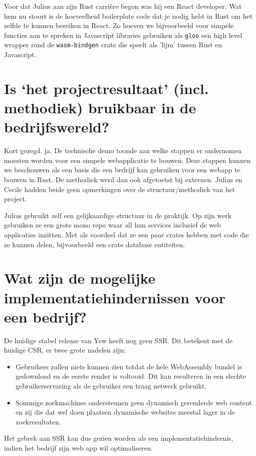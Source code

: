 Voor dat Julius aan zijn Rust carrière begon was hij een React developer. Wat hem nu stoort is de
hoeveelheid boilerplate code dat je nodig hebt in Rust om het zelfde te kunnen bereiken in React.
Zo hoeven we bijvoorbeeld voor simpele functies aan te spreken in Javascript libraries gebruiken als
\texttt{gloo} een high level wrapper rond de \texttt{wasm-bindgen} crate die
speelt als 'lijm' tussen Rust en Javascript.

\clearpage

\section{Is ‘het projectresultaat’ (incl. methodiek) bruikbaar in de bedrijfswereld?}

Kort gezegd, ja. De technische demo toonde aan welke stappen er ondernomen moesten worden voor een
simpele webapplicatie te bouwen. Deze stappen kunnen we beschouwen als een basis die een bedrijf kan
gebruiken voor een webapp te bouwen in Rust. De methodiek werd dan ook afgetoetst bij externen.
Julius en Cecile hadden beide geen opmerkingen over de structuur/methodiek van het project. 

Julius gebruikt zelf een gelijkaardige structuur in de praktijk. Op zijn werk gebruiken ze een grote
mono repo waar all hun services inclusief de web applicaties inzitten. Met als voordeel dat ze een
paar crates hebben met code die ze kunnen delen, bijvoorbeeld een crate database entiteiten.

\section{Wat zijn de mogelijke implementatiehindernissen voor een bedrijf?}

De huidige stabel release van Yew heeft nog geen SSR. Dit betekent met de huidige CSR, er twee grote
nadelen zijn:
\begin{itemize}
   \item Gebruikers zullen niets kunnen zien totdat de hele WebAssembly bundel is gedownload en de
   eerste render is voltooid. Dit kan resulteren in een slechte gebruikerservaring als de gebruiker
   een traag netwerk gebruikt.

  \item Sommige zoekmachines ondersteunen geen dynamisch gerenderde web content en zij die dat wel
  doen plaatsen dynamische websites meestal lager in de zoekresultaten.
\end{itemize}
Het gebrek aan SSR kan dus gezien worden als een implementatiehindernis, indien het bedrijf zijn web
app wil optimaliseren.

